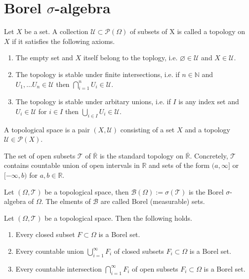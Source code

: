 \section{Borel \(\sigma\)-algebra}
\begin{definition}[Topology]
    Let {\color{mathif}\(X\)} be a {\color{mathif}set}. A {\color{mathif}collection \(\mathcal{U} \subset \mathcal{P}(\Omega)\)} of {\color{mathif}subsets} of {\color{mathif}X} is called a {\color{maththen}topology} on {\color{maththen}\(X\)} if it satisfies the following axioms.
    \begin{enumerate}
        \item The {\color{mathif}empty set} and {\color{mathif}\(X\)} itself belong to the toplogy, i.e. \(\varnothing \in \mathcal{U}\) and \(X \in \mathcal{U}\).
        \item The topology is stable under finite intersections, i.e. if \(n \in \mathbb{N}\) and \(U_1, \dots U_n \in \mathcal{U}\) then \(\bigcap_{i=1}^n U_i \in \mathcal{U}\).
        \item The topology is stable under arbitary unions, i.e. if \(I\) is any index set and \(U_i \in \mathcal{U}\) for \(i \in I\) then \(\bigcup_{i \in I} U_i \in \mathcal{U}\).
    \end{enumerate}
    A {\color{maththen}topological space} is a {\color{mathif}pair \((X, \mathcal{U})\)} consisting of a {\color{mathif}set \(X\)} and a {\color{mathif}topology \(\mathcal{U} \in \mathcal{P}(X)\)}.
\end{definition}
\begin{example}
    The set of open subsets \(\mathcal{T}\) of \(\overline{\mathbb{R}}\) is the standard topology on \(\overline{\mathbb{R}}\). Concretely, \(\mathcal{T}\) contains countable union of open intervals in \(\mathbb{R}\) and sets of the form \((a, \infty]\) or \([-\infty, b)\) for \(a, b \in \mathbb{R}\).
\end{example}
\begin{definition}
    Let \((\Omega, \mathcal{T})\) be a topological space, then \(\mathcal{B}(\Omega) := \sigma(\mathcal{T})\) is the Borel \(\sigma\)-algebra of \(\Omega\). The elments of \(\mathcal{B}\) are called Borel (measurable) sets.
\end{definition}
\begin{theorem}
    Let \((\Omega, \mathcal{T})\) be a topological space. Then the following holds.
    \begin{enumerate}
        \item Every closed subset \(F \subset \Omega\) is a Borel set.
        \item Every countable union \(\bigcup_{i=1}^\infty F_i\) of closed subsets \(F_i \subset \Omega\) is a Borel set.
        \item Every countable intersection \(\bigcap_{i=1}^\infty F_i\) of open subsets \(F_i \subset \Omega\) is a Borel set.
    \end{enumerate}
\end{theorem}
